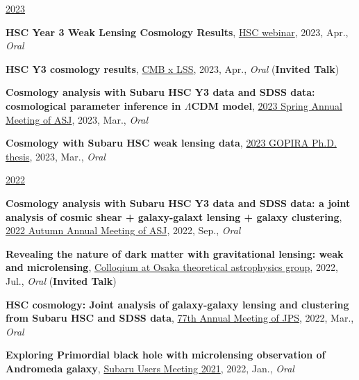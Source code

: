 \underline{2023}
\begin{etaremune}
\setcounter{enumi}{28}
\item \textbf{HSC Year 3 Weak Lensing Cosmology Results}, \href{https://hsc-release.mtk.nao.ac.jp/doc/index.php/wly3/}{HSC webinar}, 2023, Apr., \textit{Oral}
\item \textbf{HSC Y3 cosmology results}, \href{https://www2.yukawa.kyoto-u.ac.jp/~cmb-lss/index.php}{CMB x LSS}, 2023, Apr., \textit{Oral} (\textbf{Invited Talk})
\item \textbf{Cosmology analysis with Subaru HSC Y3 data and SDSS data: cosmological parameter inference in $\Lambda$CDM model}, \href{https://www.asj.or.jp/nenkai/archive/2023a/pdf/U20a.pdf}{2023 Spring Annual Meeting of ASJ}, 2023, Mar., \textit{Oral}
\item \textbf{Cosmology with Subaru HSC weak lensing data}, \href{http://gopira.jp/Dthesis2022/program.html}{2023 GOPIRA Ph.D. thesis}, 2023, Mar., \textit{Oral}
\end{etaremune}

\underline{2022}
\begin{etaremune}
\setcounter{enumi}{24}
\item \textbf{Cosmology analysis with Subaru HSC Y3 data and SDSS data: a joint analysis of cosmic shear + galaxy-galaxt lensing + galaxy clustering}, \href{https://www.asj.or.jp/nenkai/archive/2022b/pdf/U15a.pdf}{2022 Autumn Annual Meeting of ASJ}, 2022, Sep., \textit{Oral}
\item \textbf{Revealing the nature of dark matter with gravitational lensing: weak and microlensing}, \href{http://astro-osaka.jp/OUTAP/colloquium-abstracts.html#sugiyama}{Colloqium at Osaka theoretical astrophysics group}, 2022, Jul., \textit{Oral} (\textbf{Invited Talk})
\item \textbf{HSC cosmology: Joint analysis of galaxy-galaxy lensing and clustering from Subaru HSC and SDSS data}, \href{https://www.jps.or.jp/activities/meetings/annual/annual-index.php}{77th Annual Meeting of JPS}, 2022, Mar., \textit{Oral}
\item \textbf{Exploring Primordial black hole with microlensing observation of Andromeda galaxy}, \href{https://subarutelescope.org/Science/SubaruUM/SubaruUM2021/}{Subaru Users Meeting 2021}, 2022, Jan., \textit{Oral}
\end{etaremune}

